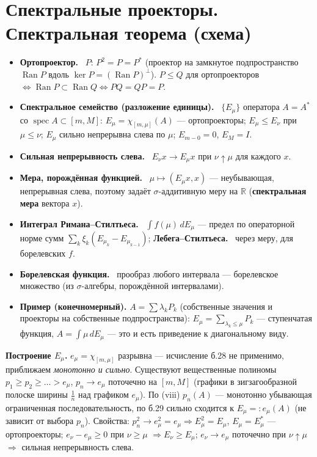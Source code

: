\documentclass[11pt,a4paper]{article}
\newcommand{\RR}{\mathbb R}
\newcommand{\spec}{\operatorname{spec}}
\newcommand{\Ran}{\operatorname{Ran}}
\newcommand{\df}[1]{\textbf{#1.}~}
\begin{document}
\section{Спектральные проекторы. Спектральная теорема (схема)}
\begin{defs}
\begin{itemize}
\item \df{Ортопроектор} $P$: $P^2=P=P^*$ (проектор на замкнутое подпространство $\Ran P$ вдоль $\ker P=(\Ran P)^\perp$). $P\le Q$ для ортопроекторов $\iff\Ran P\subset\Ran Q\iff PQ=QP=P$.
\item \df{Спектральное семейство (разложение единицы)} $\{E_\mu\}$ оператора $A=A^*$ со $\spec A\subset[m,M]$: $E_\mu=\chi_{[m,\mu]}(A)$ — ортопроекторы; $E_\mu\le E_\nu$ при $\mu\le\nu$; $E_\mu$ сильно непрерывна слева по $\mu$; $E_{m-0}=0$, $E_M=I$.
\item \df{Сильная непрерывность слева} $E_\nu x\to E_\mu x$ при $\nu\uparrow\mu$ для каждого $x$.
\item \df{Мера, порождённая функцией} $\mu\mapsto(E_\mu x,x)$ — неубывающая, непрерывная слева, поэтому задаёт $\sigma$-аддитивную меру на $\RR$ (\textbf{спектральная мера} вектора $x$).
\item \df{Интеграл Римана–Стилтьеса} $\int f(\mu)\,dE_\mu$ — предел по операторной норме сумм $\sum_k\xi_k(E_{\mu_k}-E_{\mu_{k-1}})$; \df{Лебега–Стилтьеса} через меру, для борелевских $f$.
\item \df{Борелевская функция} прообраз любого интервала — борелевское множество (из $\sigma$-алгебры, порождённой интервалами).
\item \textbf{Пример (конечномерный).} $A=\sum\lambda_kP_k$ (собственные значения и проекторы на собственные подпространства): $E_\mu=\sum_{\lambda_k\le\mu}P_k$ — ступенчатая функция, $A=\int\mu\,dE_\mu$ — это и есть приведение к диагональному виду.
\end{itemize}
\end{defs}

\textbf{Построение $E_\mu$.} $e_\mu=\chi_{[m,\mu]}$ разрывна — исчисление б.28 не применимо, приближаем \textit{монотонно и сильно}. Существуют вещественные полиномы $p_1\ge p_2\ge\dots>e_\mu$, $p_n\to e_\mu$ поточечно на $[m,M]$ (графики в зигзагообразной полоске ширины $\frac1n$ над графиком $e_\mu$). По (viii) $p_n(A)$ — монотонно убывающая ограниченная последовательность, по б.29 сильно сходится к $E_\mu=:e_\mu(A)$ (не зависит от выбора $p_n$). Свойства: $p_n^2\to e_\mu^2=e_\mu\Rightarrow E_\mu^2=E_\mu$, $E_\mu=E_\mu^*$ — ортопроекторы; $e_\nu-e_\mu\ge0$ при $\nu\ge\mu$ $\Rightarrow E_\nu\ge E_\mu$; $e_\nu\to e_\mu$ поточечно при $\nu\uparrow\mu$ $\Rightarrow$ сильная непрерывность слева.
\end{document}
